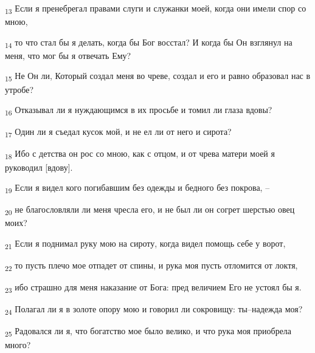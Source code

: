 \begin{tcolorbox}
\textsubscript{13} Если я пренебрегал правами слуги и служанки моей, когда они имели спор со мною,
\end{tcolorbox}
\begin{tcolorbox}
\textsubscript{14} то что стал бы я делать, когда бы Бог восстал? И когда бы Он взглянул на меня, что мог бы я отвечать Ему?
\end{tcolorbox}
\begin{tcolorbox}
\textsubscript{15} Не Он ли, Который создал меня во чреве, создал и его и равно образовал нас в утробе?
\end{tcolorbox}
\begin{tcolorbox}
\textsubscript{16} Отказывал ли я нуждающимся в их просьбе и томил ли глаза вдовы?
\end{tcolorbox}
\begin{tcolorbox}
\textsubscript{17} Один ли я съедал кусок мой, и не ел ли от него и сирота?
\end{tcolorbox}
\begin{tcolorbox}
\textsubscript{18} Ибо с детства он рос со мною, как с отцом, и от чрева матери моей я руководил [вдову].
\end{tcolorbox}
\begin{tcolorbox}
\textsubscript{19} Если я видел кого погибавшим без одежды и бедного без покрова, --
\end{tcolorbox}
\begin{tcolorbox}
\textsubscript{20} не благословляли ли меня чресла его, и не был ли он согрет шерстью овец моих?
\end{tcolorbox}
\begin{tcolorbox}
\textsubscript{21} Если я поднимал руку мою на сироту, когда видел помощь себе у ворот,
\end{tcolorbox}
\begin{tcolorbox}
\textsubscript{22} то пусть плечо мое отпадет от спины, и рука моя пусть отломится от локтя,
\end{tcolorbox}
\begin{tcolorbox}
\textsubscript{23} ибо страшно для меня наказание от Бога: пред величием Его не устоял бы я.
\end{tcolorbox}
\begin{tcolorbox}
\textsubscript{24} Полагал ли я в золоте опору мою и говорил ли сокровищу: ты--надежда моя?
\end{tcolorbox}
\begin{tcolorbox}
\textsubscript{25} Радовался ли я, что богатство мое было велико, и что рука моя приобрела много?
\end{tcolorbox}
